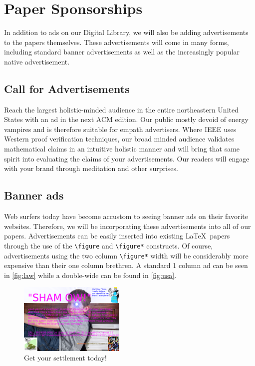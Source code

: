 \section{Paper Sponsorships}
\label{sec:sponsors}
In addition to ads on our Digital Library, we will also be adding
advertisements to the papers themselves.
These advertisements will come in many forms, including standard banner
advertisements as well as the increasingly popular native advertisement.

\subsection{Call for Advertisements}
Reach the largest holistic-minded audience in the entire northeastern United
States with an ad in the next ACM edition.
Our public mostly devoid of energy vampires and is therefore suitable for
empath advertisers.
Where IEEE uses Western proof verification techniques, our broad minded
audience validates mathematical claims in an intuitive holistic manner and will
bring that same spirit into evaluating the claims of your advertisements.
Our readers will engage with your brand through meditation and other
surprises.

\subsection{Banner ads}
Web surfers today have become accustom to seeing banner ads on their favorite
websites.
Therefore, we will be incorporating these advertisements into all of our
papers.
Advertisements can be easily inserted into existing \LaTeX\ papers through the
use of the \texttt{\textbackslash figure} and \texttt{\textbackslash figure*}
constructs.
Of course, advertisements using the two column \texttt{\textbackslash figure*}
width will be considerably more expensive than their one column brethren.
A standard 1 column ad can be seen in \autoref{fig:law} while a double-wide can
be found in \autoref{fig:usa}.

\begin{figure}
\centering
\includegraphics[width=0.45\textwidth]{figures/law-kid-ad.png}
\caption{Get your settlement today! }
\label{fig:law}
\end{figure}


